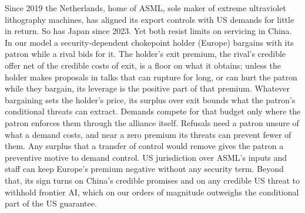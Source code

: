 Since 2019 the Netherlands, home of ASML, sole maker of extreme ultraviolet lithography machines, has aligned its export controls with US demands for little in return. So has Japan since 2023. Yet both resist limits on servicing in China. In our model a security-dependent chokepoint holder (Europe) bargains with its patron while a rival bids for it. The holder's exit premium, the rival's credible offer net of the credible costs of exit, is a floor on what it obtains; unless the holder makes proposals in talks that can rupture for long, or can hurt the patron while they bargain, its leverage is the positive part of that premium. Whatever bargaining sets the holder's price, its surplus over exit bounds what the patron's conditional threats can extract. Demands compete for that budget only where the patron enforces them through the alliance itself. Refusals need a patron unsure of what a demand costs, and near a zero premium its threats can prevent fewer of them. Any surplus that a transfer of control would remove gives the patron a preventive motive to demand control. US jurisdiction over ASML's inputs and staff can keep Europe's premium negative without any security term. Beyond that, its sign turns on China's credible promises and on any credible US threat to withhold frontier AI, which on our orders of magnitude outweighs the conditional part of the US guarantee.

